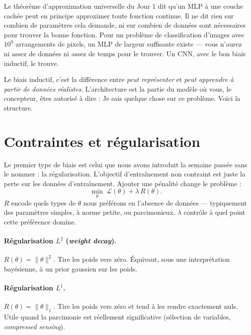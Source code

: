 Le théorème d'approximation universelle du Jour 1 dit qu'un MLP à une couche cachée peut en principe approximer toute fonction continue. Il ne dit rien sur combien de paramètres cela demande, ni sur combien de données sont nécessaires pour trouver la bonne fonction. Pour un problème de classification d'images avec $10^9$ arrangements de pixels, un MLP de largeur suffisante existe --- vous n'aurez ni assez de données ni assez de temps pour le trouver. Un CNN, avec le bon biais inductif, le trouve.

\begin{intuition}
Le biais inductif, c'est la différence entre \emph{peut représenter} et \emph{peut apprendre à partir de données réalistes}. L'architecture est la partie du modèle où vous, le concepteur, êtes autorisé à dire : \og Je sais quelque chose sur ce problème. Voici la structure. \fg
\end{intuition}

\section{Contraintes et régularisation}

Le premier type de biais est celui que nous avons introduit la semaine passée sans le nommer : la régularisation. L'objectif d'entraînement non contraint est juste la perte sur les données d'entraînement. Ajouter une pénalité change le problème :
\[
\min_\theta \; \mathcal{L}(\theta) + \lambda \, R(\theta).
\]
$R$ encode quels types de $\theta$ nous préférons en l'absence de données --- typiquement des paramètres simples, à norme petite, ou parcimonieux. $\lambda$ contrôle à quel point cette préférence domine.

\paragraph{Régularisation $L^2$ (\emph{weight decay}).} $R(\theta) = \|\theta\|^2$. Tire les poids vers zéro. Équivaut, sous une interprétation bayésienne, à un prior gaussien sur les poids.

\paragraph{Régularisation $L^1$.} $R(\theta) = \|\theta\|_1$. Tire les poids vers zéro et tend à les rendre exactement nuls. Utile quand la parcimonie est réellement significative (sélection de variables, \emph{compressed sensing}).

